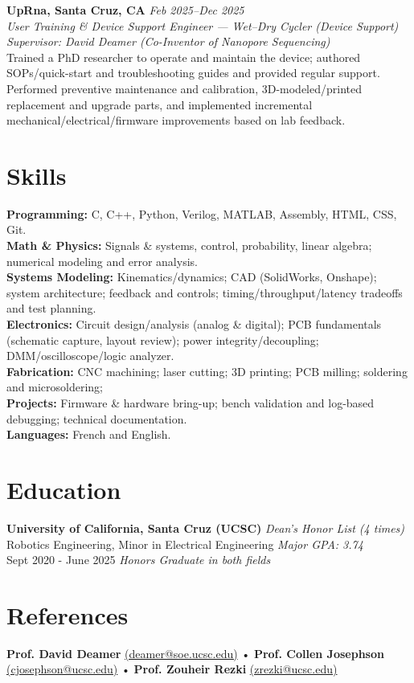 \documentclass[a4paper,9pt]{article}
\begin{document}
\textbf{UpRna, Santa Cruz, CA} \hfill \textit{Feb 2025--Dec 2025} \\
\textit{User Training & Device Support Engineer — Wet–Dry Cycler (Device Support)} \\
\textit{Supervisor: David Deamer (Co-Inventor of Nanopore Sequencing)} \\[0.3em]
Trained a PhD researcher to operate and maintain the device; authored SOPs/quick-start and troubleshooting guides and provided regular support. Performed preventive maintenance and calibration, 3D-modeled/printed replacement and upgrade parts, and implemented incremental mechanical/electrical/firmware improvements based on lab feedback.

\section*{Skills}
\textbf{Programming:} C, C++, Python, Verilog, MATLAB, Assembly, HTML, CSS, Git.\\
\textbf{Math \& Physics:} Signals \& systems, control, probability, linear algebra; numerical modeling and error analysis. \\
\textbf{Systems Modeling:} Kinematics/dynamics; CAD (SolidWorks, Onshape); system architecture; feedback and controls; timing/throughput/latency tradeoffs and test planning. \\
\textbf{Electronics:} Circuit design/analysis (analog \& digital); PCB fundamentals (schematic capture, layout review); power integrity/decoupling; DMM/oscilloscope/logic analyzer. \\
\textbf{Fabrication:} CNC machining; laser cutting; 3D printing; PCB milling; soldering and microsoldering;\\
\textbf{Projects:} Firmware \& hardware bring-up; bench validation and log-based debugging; technical documentation. \\
\textbf{Languages:} French and English.

\section*{Education}
\small
\textbf{University of California, Santa Cruz (UCSC)} \hfill \textit{Dean's Honor List (4 times)} \\
Robotics Engineering, Minor in Electrical Engineering \hfill \textit{Major GPA: 3.74} \\
Sept 2020 - June 2025 \hfill \textit{Honors Graduate in both fields}

\section*{References}
\footnotesize
\textbf{Prof. David Deamer} \href{mailto:deamer@soe.ucsc.edu}{(deamer@soe.ucsc.edu)} • \textbf{Prof. Collen Josephson} \href{mailto:cjosephson@ucsc.edu}{(cjosephson@ucsc.edu)} • \textbf{Prof. Zouheir Rezki} \href{mailto:zrezki@ucsc.edu}{(zrezki@ucsc.edu)}
\end{document}
